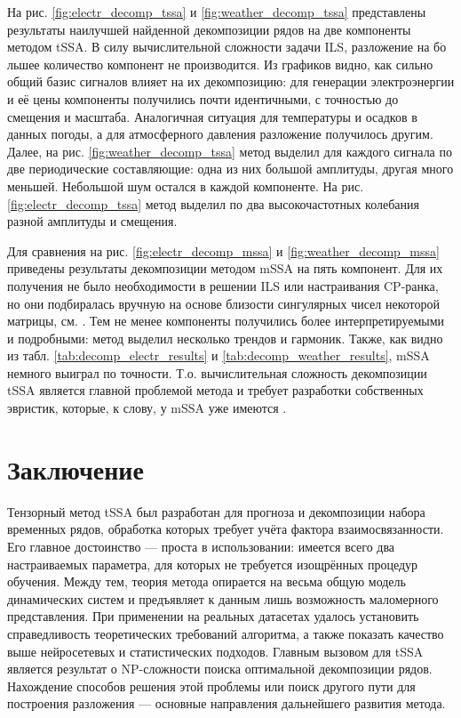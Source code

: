	На рис. \ref{fig:electr_decomp_tssa} и \ref{fig:weather_decomp_tssa} представлены результаты наилучшей найденной декомпозиции рядов на две компоненты методом tSSA. В силу вычислительной сложности задачи ILS, разложение на б$\acute{\text{о}}$льшее количество компонент не производится. Из графиков видно, как сильно общий базис сигналов влияет на их декомпозицию: для генерации электроэнергии и её цены компоненты получились почти идентичными, с точностью до смещения и масштаба. Аналогичная ситуация для температуры и осадков в данных погоды, а для атмосферного давления разложение получилось другим. Далее, на рис. \ref{fig:weather_decomp_tssa} метод выделил для каждого сигнала по две периодические составляющие: одна из них большой амплитуды, другая много меньшей. Небольшой шум остался в каждой компоненте. На рис. \ref{fig:electr_decomp_tssa} метод выделил по два высокочастотных колебания разной амплитуды и смещения.
	
	Для сравнения на рис. \ref{fig:electr_decomp_mssa} и \ref{fig:weather_decomp_mssa} приведены результаты декомпозиции методом mSSA на пять компонент. Для их получения не было необходимости в решении ILS или настраивания CP-ранка, но они подбиралась вручную на основе близости сингулярных чисел некоторой матрицы, см. \cite{ecfb9dc578be43ae9ee8fc88b8ff9151}. Тем не менее компоненты получились более интерпретируемыми и подробными: метод выделил несколько трендов и гармоник. Также, как видно из табл. \ref{tab:decomp_electr_results} и \ref{tab:decomp_weather_results}, mSSA немного выиграл по точности. Т.о. вычислительная сложность декомпозиции tSSA является главной проблемой метода и требует разработки собственных эвристик, которые, к слову, у mSSA уже имеются \cite{ecfb9dc578be43ae9ee8fc88b8ff9151}.		
	
	\section{Заключение}
	
	Тензорный метод tSSA был разработан для прогноза и декомпозиции набора временных рядов, обработка которых требует учёта фактора взаимосвязанности. Его главное достоинство --- проста в использовании: имеется всего два настраиваемых параметра, для которых не требуется изощрённых процедур обучения. Между тем, теория метода опирается на весьма общую модель динамических систем и предъявляет к данным лишь возможность маломерного представления. При применении на реальных датасетах удалось установить справедливость теоретических требований алгоритма, а также показать качество выше нейросетевых и статистических подходов. Главным вызовом для tSSA является результат о NP-сложности поиска оптимальной декомпозиции рядов. Нахождение способов решения этой проблемы или поиск другого пути для построения разложения --- основные направления дальнейшего развития метода.
	
